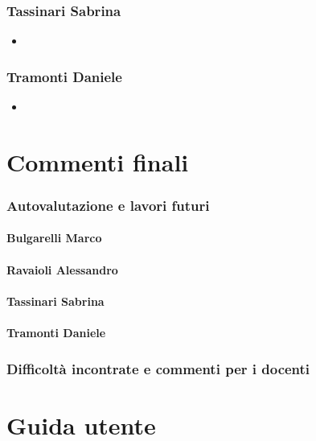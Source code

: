 \documentclass{report}
\begin{document}
\subsection{Tassinari Sabrina}
\begin{itemize}
    \item 
\end{itemize}

\subsection{Tramonti Daniele}
\begin{itemize}
    \item 
\end{itemize}

\chapter{Commenti finali}

\subsection{Autovalutazione e lavori futuri}

\subsubsection{Bulgarelli Marco}

\subsubsection{Ravaioli Alessandro}

\subsubsection{Tassinari Sabrina}

\subsubsection{Tramonti Daniele}

\subsection{Difficoltà incontrate e commenti per i docenti}

\appendix
\chapter{Guida utente}
\end{document}
